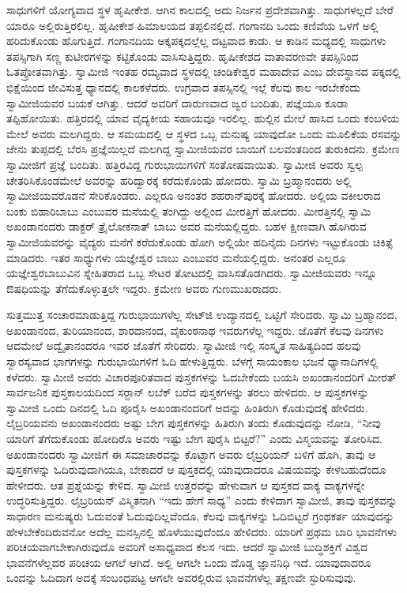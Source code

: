 ಸಾಧುಗಳಿಗೆ ಯೋಗ್ಯವಾದ ಸ್ಥಳ ಹೃಷೀಕೇಶ. ಆಗಿನ ಕಾಲದಲ್ಲಿ ಅದು ನಿರ್ಜನ ಪ್ರದೇಶವಾಗಿತ್ತು. ಸಾಧುಗಳಲ್ಲದೆ ಬೇರೆ ಯಾರೂ ಅಲ್ಲಿರುತ್ತಿರಲಿಲ್ಲ. ಹೃಷೀಕೇಶ ಹಿಮಾಲಯದ ತಪ್ಪಲಿನಲ್ಲಿದೆ. ಗಂಗಾನದಿ ಒಂದು ಕಣಿವೆಯ ಒಳಗೆ ಅಲ್ಲಿ ಹರಿದುಕೊಂಡು ಹೊಗುತ್ತಿದೆ. ಗಂಗಾನದಿಯ ಅಕ್ಕಪಕ್ಕದಲ್ಲೆಲ್ಲ ದಟ್ಟವಾದ ಕಾಡು. ಆ ಕಾಡಿನ ಮಧ್ಯದಲ್ಲಿ ಸಾಧುಗಳು ತಪಸ್ಸಿಗಾಗಿ ಸಣ್ಣ ಕುಟೀರಗಳನ್ನು ಕಟ್ಟಿಕೊಂಡು ವಾಸಿಸುತ್ತಿದ್ದರು. ಹೃಷೀಕೇಶದ ವಾತಾವರಣವೇ ತಪಸ್ಸಿನಿಂದ ಓತಪ್ರೋತವಾಗಿತ್ತು. ಸ್ವಾಮೀಜಿ ಇಂತಹ ರಮ್ಯವಾದ ಸ್ಥಳದಲ್ಲಿ ಚಂಡಿಕೇಶ್ವರ ಮಹಾದೇವ ಎಂಬ ದೇವಸ್ಥಾನದ ಪಕ್ಕದಲ್ಲಿ ಭಿಕ್ಷೆಯಿಂದ ಜೀವಿಸುತ್ತ ಧ್ಯಾನದಲ್ಲಿ ಕಾಲಕಳೆದರು. ಉಗ್ರವಾದ ತಪಸ್ಸಿನಲ್ಲಿ ಇಲ್ಲೆ ಕೆಲವು ಕಾಲ ಇರಬೇಕೆಂದು ಸ್ವಾಮೀಜಿಯವರ ಬಯಕೆ ಆಗಿತ್ತು. ಆದರೆ ಅವರಿಗೆ ದಾರುಣವಾದ ಜ್ವರ ಬಂದಿತು, ಪಜ್ಞೆಯೂ ಕೂಡಾ ತಪ್ಪಿಹೋಯಿತು. ಹತ್ತಿರದಲ್ಲಿ ಯಾವ ವೈದ್ಯಕೀಯ ಸಹಾಯವೂ ಇರಲಿಲ್ಲ. ಹುಲ್ಲಿನ ಮೇಲೆ ಹಾಸಿದ ಒಂದು ಕಂಬಳಿಯ ಮೇಲೆ ಅವರು ಮಲಗಿದ್ದರು. ಆ ಸಮಯದಲ್ಲಿ ಆ ಸ್ಥಳದ ಒಬ್ಬ ಮನುಷ್ಯ ಯಾವುದೋ ಒಂದು ಮೂಲಿಕೆಯ ರಸವನ್ನು ಜೇನು ತುಪ್ಪದಲ್ಲಿ ಬೆರಸಿ ಪ್ರಜ್ಞೆಯಿಲ್ಲದೆ ಮಲಗಿದ್ದ ಸ್ವಾಮೀಜಿಯವರ ಬಾಯಿಗೆ ಬಲವಂತದಿಂದ ತುರುಕಿದನು. ಕ್ರಮೇಣ ಸ್ವಾಮೀಜಿಗೆ ಪ್ರಜ್ಞೆ ಬಂದಿತು. ಹತ್ತಿರವಿದ್ದ ಗುರುಭಾಯಿಗಳಿಗೆ ಸಂತೋಷವಾಯಿತು. ಸ್ವಾಮೀಜಿ ಅವರು ಸ್ವಲ್ಪ ಚೇತರಿಸಿಕೊಂಡಮೇಲೆ ಅವರನ್ನು ಹರಿದ್ವಾರಕ್ಕೆ ಕರೆದುಕೊಂಡು ಹೋದರು. ಸ್ವಾಮಿ ಬ್ರಹ್ಮಾನಂದರು ಅಲ್ಲಿ ಸ್ವಾಮೀಜಿಯವರೊಡನೆ ಸೇರಿಕೊಂಡರು. ಎಲ್ಲರೂ ಅನಂತರ ಶಹರಾನ್‍ಪುರಕ್ಕೆ ಹೋದರು. ಅಲ್ಲಿಯ ವಕೀಲರಾದ ಬಂಕು ಬಿಹಾರಿಬಾಬು ಎಂಬುವರ ಮನೆಯಲ್ಲಿ ತಂಗಿದ್ದು ಅಲ್ಲಿಂದ ಮೀರತ್ತಿಗೆ ಹೋದರು. ಮೀರತ್ತಿನಲ್ಲಿ ಸ್ವಾಮಿ ಅಖಂಡಾನಂದರು ಡಾಕ್ಟರ್ ತ್ರೈಲೋಕನಾತ್ ಬಾಬು ಅವರ ಮನೆಯಲ್ಲಿದ್ದರು. ಬಹಳ ಕ್ಷೀಣವಾಗಿ ಹೊಗಿರುವ ಸ್ವಾಮೀಜಿಯವರನ್ನು ವೈದ್ಯರು ಮನೆಗೆ ಕರೆದುಕೊಂಡು ಹೋಗಿ ಅಲ್ಲಿಯೇ ಹದಿನೈದು ದಿನಗಳು ಇಟ್ಟುಕೊಂಡು ಚಿಕಿತ್ಸೆ ಮಾಡಿದರು. ಇತರ ಸಾಧ್ಯುಗಳು ಯಜ್ಞೇಶ್ವರ ಬಾಬು ಎಂಬುವರ ಮನೆಯಲ್ಲಿದ್ದರು. ಅನಂತರ ಎಲ್ಲರೂ ಯಜ್ಞೇಶ್ವರಬಾಬುವಿನ ಸ್ನೇಹಿತರಾದ ಒಬ್ಬ ಸೇಟರ ತೋಟದಲ್ಲಿ ವಾಸಿಸತೊಡಗಿದರು. ಸ್ವಾಮೀಜಿಯವರು ಇನ್ನೂ ಔಷಧಿಯನ್ನು ತೆಗೆದುಕೊಳ್ಳುತ್ತಲೇ ಇದ್ದರು. ಕ್ರಮೇಣ ಅವರು ಗುಣಮುಖರಾದರು. 

ಸುತ್ತಮುತ್ತ ಸಂಚಾರಮಾಡುತ್ತಿದ್ದ ಗುರುಭಾಯಿಗಳೆಲ್ಲ ಸೇಟ್‍ಜಿ ಉದ್ಯಾನದಲ್ಲಿ ಒಟ್ಟಿಗೆ ಸೇರಿದರು. ಸ್ವಾಮಿ ಬ್ರಹ್ಮಾನಂದ, ಅಖಂಡಾನಂದ, ತುರಿಯಾನಂದ, ಶಾರದಾನಂದ, ವೈಕುಂಠನಾಥ ಇವರುಗಳೆಲ್ಲ ಇದ್ದರು. ಜೊತೆಗೆ ಕೆಲವು ದಿನಗಳು ಆದಮೇಲೆ ಅದ್ವೈತಾನಂದರೂ ಇವರ ಜೊತೆಗೆ ಸೇರಿದರು. ಸ್ವಾಮೀಜಿ ಇಲ್ಲಿ ಸಂಸ್ಕೃತ ಸಾಹಿತ್ಯದಿಂದ ಹಲವು ಸ್ವಾರಸ್ಯವಾದ ಭಾಗಗಳನ್ನು ಗುರುಭಾಯಿಗಳಿಗೆ ಓದಿ ಹೇಳುತ್ತಿದ್ದರು. ಬೆಳಗ್ಗೆ ಸಾಯಂಕಾಲ ಭಜನೆ ಧ್ಯಾನಾದಿಗಳಲ್ಲಿ ಕಳೆದರು. ಸ್ವಾಮೀಜಿ ಅವರು ವಿಚಾರಪೂರಿತವಾದ ಪುಸ್ತಕಗಳನ್ನು ಓದಬೇಕೆಂದು ಬಯಸಿ ಅಖಂಡಾನಂದರಿಗೆ ಮೀರತ್ ಸಾರ್ವಜನಿಕ ಪುಸ್ತಕಾಲಯದಿಂದ ಸರ್‍ಜಾನ್ ಲಬೆಕ್ ಬರೆದ ಪುಸ್ತಕಗಳನ್ನು ತರಲು ಹೇಳಿದರು. ಆ ಪುಸ್ತಕಗಳನ್ನು ಸ್ವಾಮೀಜಿ ಒಂದು ದಿನದಲ್ಲಿ ಓದಿ ಪೂರೈಸಿ ಅಖಂಡಾನಂದರಿಗೆ ಅದನ್ನು ಹಿಂತಿರುಗಿ ಕೊಡುವುದಕ್ಕೆ ಹೇಳಿದರು. ಲೈಬ್ರರಿಯವನು ಅಖಂಡಾನಂದರು ಅಷ್ಟು ಬೇಗ ಪುಸ್ತಕಗಳನ್ನು ಹಿತಿರುಗಿ ತಂದು ಕೊಡುವುದನ್ನು ನೋಡಿ, “ನೀವು ಯಾರಿಗೆ ತೆಗೆದುಕೊಂಡು ಹೋದಿರೊ ಅವರು ಇಷ್ಟು ಬೇಗ ಪುರೈಸಿ ಬಿಟ್ಟರೆ?” ಎಂದು ವಿಸ್ಮಯವನ್ನು ತೋರಿಸಿದ. ಅಖಂಡಾನಂದರು ಸ್ವಾಮೀಜಿಗೆ ಈ ಸಮಾಚಾರವನ್ನು ಕೊಟ್ಟಾಗ ಅವರು ಲೈಬ್ರರಿಯನ್ ಬಳಿಗೆ ಹೊಗಿ, ತಾವು ಆ ಪುಸ್ತಕಗಳನ್ನು ಓದಿರುವುದಾಗಿಯೂ, ಬೇಕಾದರೆ ಆ ಪುಸ್ತಕದಲ್ಲಿ ಯಾವುದಾದರೂ ವಿಷಯವನ್ನು ಕೇಳಬಹುದೆಂದೂ ಹೇಳೀದರು. ಆತ ಪ್ರಶ್ನೆಯನ್ನು ಕೇಳಿದ. ಸ್ವಾಮೀಜಿ ಉತ್ತರವನ್ನು ಹೇಳುವಾಗ ಆ ಪುಸ್ತಕದ ವಾಕ್ಯ ವಾಕ್ಯಗಳನ್ನೇ ಉದ್ಧರಿಸುತ್ತಿದ್ದರು. ಲೈಬ್ರರಿಯನ್ ವಿಸ್ಮಿತನಾಗಿ “ಇದು ಹೇಗೆ ಸಾಧ್ಯ” ಎಂದು ಕೇಳಿದಾಗ ಸ್ವಾಮೀಜಿ, ತಾವು ಪುಸ್ತಕವನ್ನು ಸಾಧಾರಣ ಮನುಷ್ಯರು ಓದುವಂತೆ ಓದುವುದಿಲ್ಲವೆಂದೂ, ಕೆಲವು ವಾಕ್ಯಗಳನ್ನು ಓದಿಬಿಟ್ಟರೆ ಗ್ರಂಥಕರ್ತ ಯಾವುದನ್ನು ಹೇಳಬೇಕೆಂದಿರುವನೋ ಅದೆಲ್ಲ ಮನಸ್ಸಿನಲ್ಲಿ ಹೊಳೆಯುವುದೆಂದೂ ಹೇಳಿದರು. ಯಾರಿಗೆ ಪ್ರಥಮ ಬಾರಿ ಭಾವನೆಗಳು ಪರಿಚಯವಾಗಬೇಕಾಗಿರುವುದೊ ಅವರಿಗೆ ಅಸಾಧ್ಯವಾದ ಕೆಲಸ ಇದು. ಆದರೆ ಸ್ವಾಮೀಜಿ ಬುದ್ಧಿಶಕ್ತಿಗೆ ವಿಶ್ವದ ಭಾವನೆಗಳೆಲ್ಲದರ ಪರಿಚಯ ಆಗಲೆ ಆಗಿದೆ. ಅಲ್ಲಿ ಆಗಲೇ ಒಂದು ದೊಡ್ಡ ಜ್ಞಾನನಿಧಿ ಇದೆ. ಯಾವುದಾದರೂ ಒಂದನ್ನು ಓದಿದಾಗ ಅದಕ್ಕೆ ಸಂಬಂಧಪಟ್ಟ ಆಗಲೇ ಅವರಲ್ಲಿರುವ ಭಾವನೆಗಳೆಲ್ಲ ತಕ್ಷಣವೇ ಸ್ಫುರಿಸುವುವು. 


